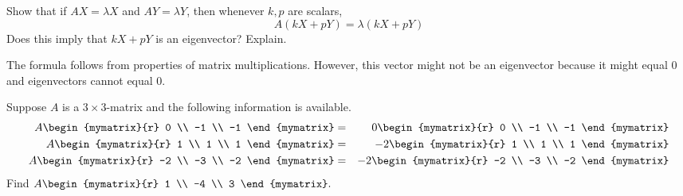 \begin{enumialphparenastyle}
\begin{ex} Show that if $AX=\lambda X$ and $AY=\lambda Y$, then whenever $k,p$ are scalars,
\begin{equation*}
A(kX+pY) =\lambda (kX+pY) 
\end{equation*}
Does this imply that $kX+pY$ is an eigenvector? Explain.
\vspace{1mm} 
\begin{sol}
The formula follows from properties of matrix multiplications. However,
this vector might not be an eigenvector because it might equal $0$
and eigenvectors cannot equal $0$. 
\end{sol}
\end{ex}

\begin{ex} Suppose $A$ is a $3\times 3$-matrix and the following information is
available. 
\begin{eqnarray*}
A\begin{mymatrix}{r}
0 \\
-1 \\
-1
\end{mymatrix} &=&0\begin{mymatrix}{r}
0 \\
-1 \\
-1
\end{mymatrix} \\
A\begin{mymatrix}{r}
1 \\
1 \\
1
\end{mymatrix} &=&-2\begin{mymatrix}{r}
1 \\
1 \\
1
\end{mymatrix} \\
A\begin{mymatrix}{r}
-2 \\
-3 \\
-2
\end{mymatrix} &=&-2\begin{mymatrix}{r}
-2 \\
-3 \\
-2
\end{mymatrix}
\end{eqnarray*}
Find $A\begin{mymatrix}{r}
1 \\
-4 \\
3
\end{mymatrix}. $
\end{ex}


\end{enumialphparenastyle}

